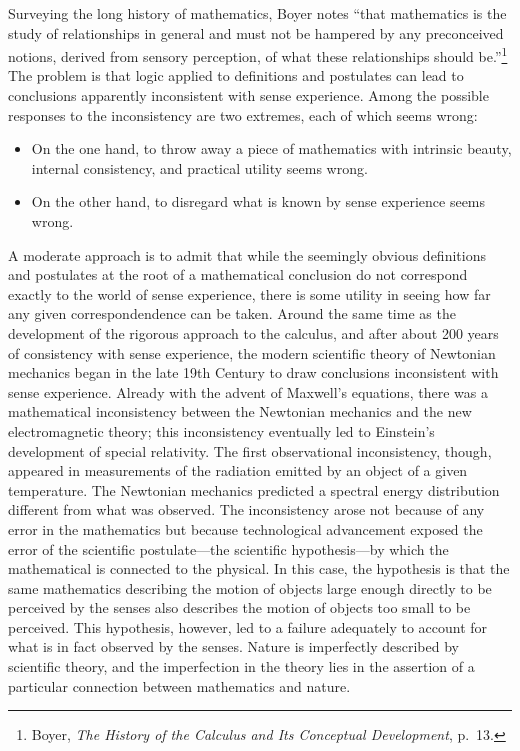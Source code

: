 Surveying the long history of mathematics, Boyer notes ``that mathematics is
the study of relationships in general and must not be hampered by any
preconceived notions, derived from sensory perception, of what these
relationships should be.''\footnote{%
   Boyer, {\it The History of the Calculus and Its Conceptual Development},
   p.~13.%
}
The problem is that logic applied to definitions and postulates can lead to
conclusions apparently inconsistent with sense experience. Among the possible
responses to the inconsistency are two extremes, each of which seems wrong:
\begin{itemize}
   \item On the one hand, to throw away a piece of mathematics with intrinsic
      beauty, internal consistency, and practical utility seems wrong.
   \item On the other hand, to disregard what is known by sense experience
      seems wrong.
\end{itemize}
A moderate approach is to admit that while the seemingly obvious definitions
and postulates at the root of a mathematical conclusion do not correspond
exactly to the world of sense experience, there is some utility in seeing how
far any given correspondendence can be taken.  Around the same time as the
development of the rigorous approach to the calculus, and after about 200 years
of consistency with sense experience, the modern scientific theory of Newtonian
mechanics began in the late 19th Century to draw conclusions inconsistent with
sense experience. Already with the advent of Maxwell's equations, there was a
mathematical inconsistency between the Newtonian mechanics and the new
electromagnetic theory; this inconsistency eventually led to Einstein's
development of special relativity. The first observational inconsistency,
though, appeared in measurements of the radiation emitted by an object of a
given temperature.  The Newtonian mechanics predicted a spectral energy
distribution different from what was observed.  The inconsistency arose not
because of any error in the mathematics but because technological advancement
exposed the error of the scientific postulate---the scientific hypothesis---by
which the mathematical is connected to the physical. In this case, the
hypothesis is that the same mathematics describing the motion of objects large
enough directly to be perceived by the senses also describes the motion of
objects too small to be perceived.  This hypothesis, however, led to a failure
adequately to account for what is in fact observed by the senses.  Nature is
imperfectly described by scientific theory, and the imperfection in the theory
lies in the assertion of a particular connection between mathematics and
nature.

